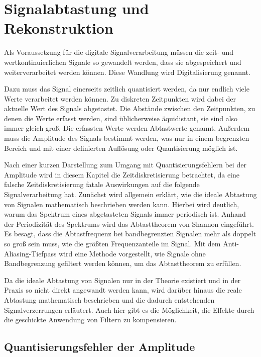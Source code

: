 \chapter{Signalabtastung und Rekonstruktion}\label{sec:signalabtastung-und-rekonstruktion}

Als Voraussetzung für die digitale Signalverarbeitung müssen die zeit- und wertkontinuierlichen Signale so gewandelt werden, dass sie abgespeichert und weiterverarbeitet werden können. Diese Wandlung wird Digitalisierung genannt.

Dazu muss das Signal einerseits zeitlich quantisiert werden, da nur endlich viele Werte verarbeitet werden können. Zu diskreten Zeitpunkten wird dabei der aktuelle Wert des Signals abgetastet. Die Abstände zwischen den Zeitpunkten, zu denen die Werte erfasst werden, sind üblicherweise äquidistant, sie sind also immer gleich groß. Die erfassten Werte werden Abtastwerte genannt. Außerdem muss die Amplitude des Signals bestimmt werden, was nur in einem begrenzten Bereich und mit einer definierten Auflösung oder Quantisierung möglich ist.

Nach einer kurzen Darstellung zum Umgang mit Quantisierungsfehlern bei der Amplitude wird in diesem Kapitel die Zeitdiskretisierung betrachtet, da eine falsche Zeitdiskretisierung fatale Auswirkungen auf die folgende Signalverarbeitung hat. Zunächst wird allgemein erklärt, wie die ideale Abtastung von Signalen mathematisch beschrieben werden kann. Hierbei wird deutlich, warum das Spektrum eines abgetasteten Signals immer periodisch ist. Anhand der Periodizität des Spektrums wird das Abtasttheorem von Shannon eingeführt. Es besagt, dass die Abtastfrequenz bei bandbegrenzten Signalen mehr als doppelt so groß sein muss, wie die größten Frequenzanteile im Signal. Mit dem Anti-Aliasing-Tiefpass wird eine Methode vorgestellt, wie Signale ohne Bandbegrenzung gefiltert werden können, um das Abtasttheorem zu erfüllen.

Da die ideale Abtastung von Signalen nur in der Theorie existiert und in der Praxis so nicht direkt angewandt werden kann, wird darüber hinaus die reale Abtastung mathematisch beschrieben und die dadurch entstehenden Signalverzerrungen erläutert. Auch hier gibt es die Möglichkeit, die Effekte durch die geschickte Anwendung von Filtern zu kompensieren.

\section{Quantisierungsfehler der Amplitude}\label{sec:2.1}


